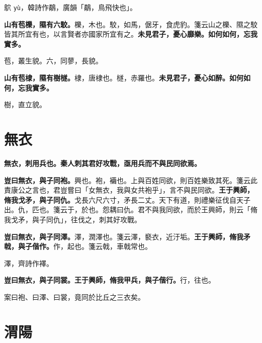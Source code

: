 \begin{quoting}鴥 \texttt{yù}，韓詩作鷸，廣韻「鷸，鳥飛快也」。\end{quoting}

\textbf{山有苞櫟，隰有六駮。}{\footnotesize 櫟，木也。駮，如馬，倨牙，食虎豹。箋云山之櫟、隰之駮皆其所宜有也，以言賢者亦國家所宜有之。}\textbf{未見君子，憂心靡樂。如何如何，忘我實多。}

\begin{quoting}苞，叢生貌。六，同蓼，長貌。\end{quoting}

\textbf{山有苞棣，隰有樹檖。}{\footnotesize 棣，唐棣也。檖，赤羅也。}\textbf{未見君子，憂心如醉。如何如何，忘我實多。}

\begin{quoting}樹，直立貌。\end{quoting}

\section{無衣}


\textbf{無衣，刺用兵也。秦人刺其君好攻戰，亟用兵而不與民同欲焉。}

\textbf{豈曰無衣，與子同袍。}{\footnotesize 興也。袍，襺也。上與百姓同欲，則百姓樂致其死。箋云此責康公之言也，君豈嘗曰「女無衣，我與女共袍乎」，言不與民同欲。}\textbf{王于興師，脩我戈矛，與子同仇。}{\footnotesize 戈長六尺六寸，矛長二丈。天下有道，則禮樂征伐自天子出。仇，匹也。箋云于，於也。怨耦曰仇。君不與我同欲，而於王興師，則云「脩我戈矛，與子同仇」，往伐之，刺其好攻戰。}

\textbf{豈曰無衣，與子同澤。}{\footnotesize 澤，潤澤也。箋云澤，褻衣，近汙垢。}\textbf{王于興師，脩我矛戟，與子偕作。}{\footnotesize 作，起也。箋云戟，車戟常也。}

\begin{quoting}澤，齊詩作襗。\end{quoting}

\textbf{豈曰無衣，與子同裳。王于興師，脩我甲兵，與子偕行。}{\footnotesize 行，往也。}

\begin{quoting}案曰袍、曰澤、曰裳，竟同於比丘之三衣矣。\end{quoting}

\section{渭陽}

